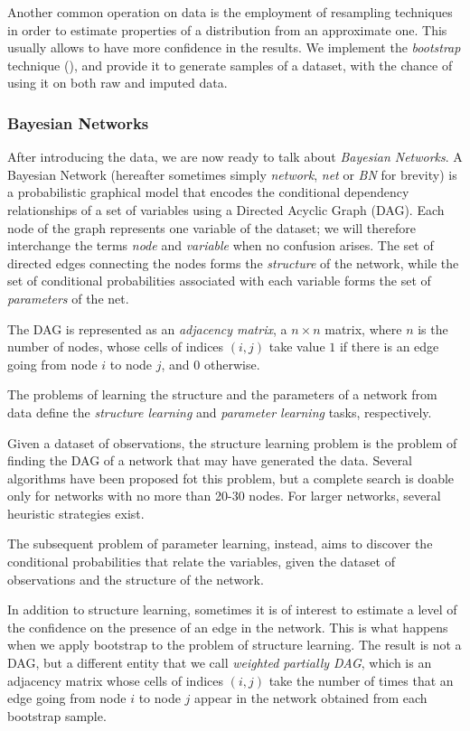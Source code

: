 \documentclass{article}\usepackage[]{graphicx}\usepackage[]{color}
\begin{document}
Another common operation on data is the employment of resampling techniques in order
to estimate properties of a distribution from an approximate one. This usually allows
to have more confidence in the results. We implement the \emph{bootstrap} technique (\citet{efron1994introduction}),
and provide it to generate samples of a dataset, with the chance of using it on both raw and imputed data.

\subsubsection{Bayesian Networks}
After introducing the data, we are now ready to talk about \emph{Bayesian Networks}. A Bayesian Network
(hereafter sometimes simply \emph{network}, \emph{net} or \emph{BN} for brevity) is a probabilistic graphical model that encodes
the conditional dependency relationships of a set of variables using a Directed Acyclic Graph (DAG).
Each node of the graph represents one variable of the dataset; we will therefore interchange
the terms \emph{node} and \emph{variable} when no confusion arises. The set of directed edges
connecting the nodes forms the \emph{structure} of the network, while the set of conditional
probabilities associated with each variable forms the set of \emph{parameters} of the net.

The DAG is represented as an \textit{adjacency matrix}, a $n\times n$ matrix, where $n$ is the number of nodes,
whose cells of indices $(i,j)$ take value $1$ if there is an edge going from node $i$ to node $j$,
and $0$ otherwise.

The problems of learning the structure and the parameters of a network from data define the
\emph{structure learning} and \emph{parameter learning} tasks, respectively. 

Given a dataset of observations, the structure learning problem is the problem of finding the DAG of a
network that may have generated the data. Several algorithms have been proposed fot this problem, but
a complete search is doable only for networks with no more than 20-30 nodes. For larger networks, several
heuristic strategies exist.

The subsequent problem of parameter learning, instead, aims to discover the conditional probabilities
that relate the variables, given the dataset of observations and the structure of the network.

In addition to structure learning, sometimes it is of interest to estimate a level of the confidence 
on the presence of an edge in the network. This is what happens when we apply bootstrap to the problem
of structure learning. The result is not a DAG, but a different entity that we call \emph{weighted partially DAG},
which is an adjacency matrix whose cells of indices $(i,j)$ take the number of times that an edge going from node $i$
to node $j$ appear in the network obtained from each bootstrap sample.
\end{document}
